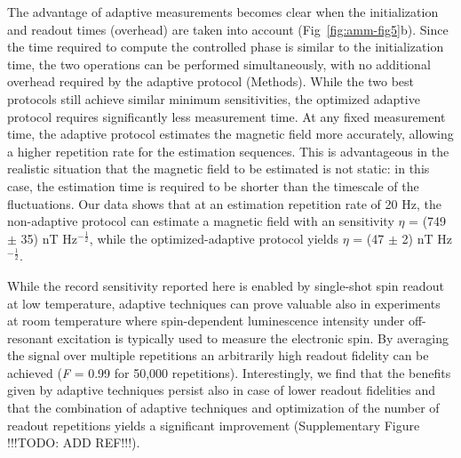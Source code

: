 The advantage of adaptive measurements becomes clear when the initialization and readout times (overhead) are taken into account (Fig \,\ref{fig:amm-fig5}b). Since the time required to compute the controlled phase is similar to the initialization time, the two operations can be performed simultaneously, with no additional overhead required by the adaptive protocol (Methods). While the two best protocols still achieve similar minimum sensitivities, the optimized adaptive protocol requires significantly less measurement time. At any fixed measurement time, the adaptive protocol estimates the magnetic field more accurately, allowing a higher repetition rate for the estimation sequences. This is advantageous in the realistic situation that the magnetic field to be estimated is not static: in this case, the estimation time is required to be shorter than the timescale of the fluctuations. Our data shows that at an estimation repetition rate of 20 Hz, the non-adaptive protocol can estimate a magnetic field with an sensitivity $\eta$ = (749 $\pm$ 35) nT Hz$^{-\frac{1}{2}}$, while the optimized-adaptive protocol yields $\eta$ = (47 $\pm$ 2) nT Hz$^{-\frac{1}{2}}$.

While the record sensitivity reported here is enabled by single-shot spin readout at low temperature, adaptive techniques can prove valuable also in experiments at room temperature\cite{Nusran_NatNano_2012} where spin-dependent luminescence intensity under off-resonant excitation is typically used to measure the electronic spin. By averaging the signal over multiple repetitions an arbitrarily high readout fidelity can be achieved (\textit{F} = 0.99 for 50,000 repetitions\cite{Nusran_NatNano_2012}). Interestingly, we find that the benefits given by adaptive techniques persist also in case of lower readout fidelities and that the combination of adaptive techniques and optimization of the number of readout repetitions yields a significant improvement (Supplementary Figure !!!TODO: ADD REF!!!).

